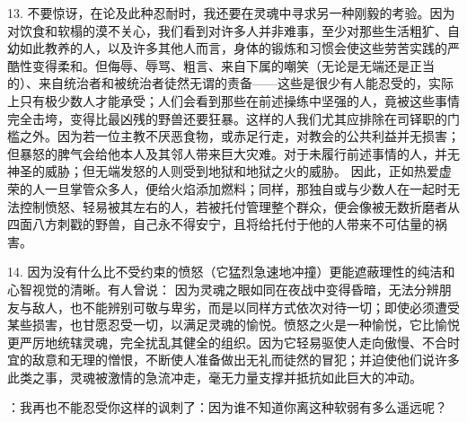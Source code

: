 13. 不要惊讶，在论及此种忍耐时，我还要在灵魂中寻求另一种刚毅的考验。因为对饮食和软榻的漠不关心，我们看到对许多人并非难事，至少对那些生活粗犷、自幼如此教养的人，以及许多其他人而言，身体的锻炼和习惯会使这些劳苦实践的严酷性变得柔和。但侮辱、辱骂、粗言、来自下属的嘲笑（无论是无端还是正当的）、来自统治者和被统治者徒然无谓的责备——这些是很少有人能忍受的，实际上只有极少数人才能承受；人们会看到那些在前述操练中坚强的人，竟被这些事情完全击垮，变得比最凶残的野兽还要狂暴。这样的人我们尤其应排除在司铎职的门槛之外。因为若一位主教不厌恶食物，或赤足行走，对教会的公共利益并无损害；但暴怒的脾气会给他本人及其邻人带来巨大灾难。对于未履行前述事情的人，并无神圣的威胁；但无端发怒的人则受到地狱和地狱之火的威胁。 因此，正如热爱虚荣的人一旦掌管众多人，便给火焰添加燃料；同样，那独自或与少数人在一起时无法控制愤怒、轻易被其左右的人，若被托付管理整个群众，便会像被无数折磨者从四面八方刺戳的野兽，自己永不得安宁，且将给托付于他的人带来不可估量的祸害。\par

14. 因为没有什么比不受约束的愤怒（它猛烈急速地冲撞）更能遮蔽理性的纯洁和心智视觉的清晰。有人曾说： 因为灵魂之眼如同在夜战中变得昏暗，无法分辨朋友与敌人，也不能辨别可敬与卑劣，而是以同样方式依次对待一切；即使必须遭受某些损害，也甘愿忍受一切，以满足灵魂的愉悦。愤怒之火是一种愉悦，它比愉悦更严厉地统辖灵魂，完全扰乱其健全的组织。因为它轻易驱使人走向傲慢、不合时宜的敌意和无理的憎恨，不断使人准备做出无礼而徒然的冒犯；并迫使他们说许多此类之事，灵魂被激情的急流冲走，毫无力量支撑并抵抗如此巨大的冲动。\par

：我再也不能忍受你这样的讽刺了：因为谁不知道你离这种软弱有多么遥远呢？\par

